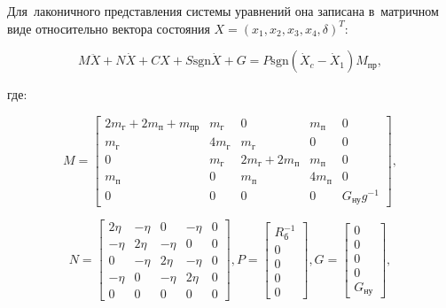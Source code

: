 Для~лаконичного представления системы уравнений она записана в~матричном виде относительно вектора состояния  $ X = (x_1, x_2, x_3, x_4, \delta)^T $:

$$ M \ddot X + N \dot X + CX + S \text{sgn} \dot X + G = P \text{sgn} ( \dot X_c - \dot X_1 ) M_{\text{пр}}, $$

где:

$$ 
M = 
\begin{bmatrix}
	2m_{\text{г}} + 2m_{\text{п}} + m_{\text{пр}} & m_{\text{г}} & 0              & m_{\text{п}}                    & 0                                 \\
	m_{\text{г}}                                                 & 4 m_{\text{г}} & m_{\text{г}}                    & 0              & 0                \\
	0                                                            & m_{\text{г}}   & 2 m_{\text{г}} + 2 m_{\text{п}} & m_{\text{п}}   & 0 \\
	m_{\text{п}}                                                 & 0              & m_{\text{п}}                    & 4 m_{\text{п}} & 0   \\
	0                                                            & 0              & 0                               & 0              & G_{\text{ну}} g^{-1}
\end{bmatrix},
$$

$$
N = 
\begin{bmatrix}
	2 \eta & - \eta & 0      & - \eta & 0 \\
	- \eta & 2 \eta & - \eta & 0      & 0 \\
	0      & - \eta & 2 \eta & - \eta & 0 \\
	- \eta & 0      & - \eta & 2 \eta & 0 \\
	0      & 0      & 0      & 0      & 0
\end{bmatrix}, P = 
\begin{bmatrix}
	R_{\text{б}}^{-1} \\
	0                 \\
	0                 \\
	0                 \\
	0
\end{bmatrix}, G = 
\begin{bmatrix}
	0                 \\
	0                 \\
	0                 \\
	0                 \\
	G_{\text{ну}}
\end{bmatrix},
$$

